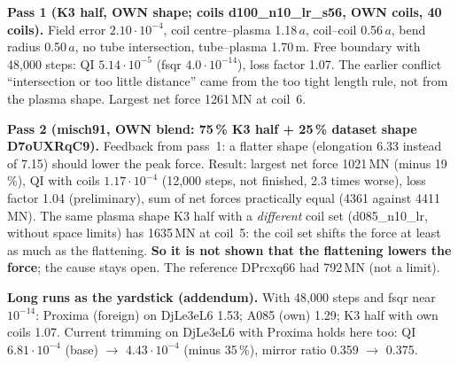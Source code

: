 \textbf{Pass 1 (K3 half, OWN shape; coils d100\_n10\_lr\_s56, OWN coils, 40 coils).} Field error $2.10\cdot10^{-4}$, coil centre--plasma 1.18\,$a$, coil--coil 0.56\,$a$, bend radius 0.50\,$a$, no tube intersection, tube--plasma 1.70\,m. Free boundary with
48,000 steps: QI $5.14\cdot10^{-5}$ (fsqr $4.0\cdot10^{-14}$), loss factor 1.07. The earlier conflict ``intersection or too little distance'' came from the too tight length rule, not from the plasma shape. Largest net force 1261\,MN at coil~6.

\textbf{Pass 2 (misch91, OWN blend: 75\,\% K3 half + 25\,\% dataset shape D7oUXRqC9).} Feedback from pass~1: a flatter shape (elongation 6.33 instead of 7.15) should lower the peak force. Result: largest net force 1021\,MN (minus 19\,\%), QI with coils $1.17\cdot10^{-4}$ (12,000 steps, not finished,
2.3 times worse), loss factor 1.04 (preliminary), sum of net forces practically equal (4361 against 4411\,MN). The same plasma shape K3 half with a \emph{different} coil set (d085\_n10\_lr, without space limits) has 1635\,MN at coil~5: the coil set shifts the force at least as much as
the flattening. \textbf{So it is not shown that the flattening lowers the force}; the cause stays open. The reference DPrcxq66 had 792\,MN (not a limit).

\textbf{Long runs as the yardstick (addendum).} With 48,000 steps and fsqr near $10^{-14}$: Proxima (foreign) on DjLe3eL6 1.53; A085 (own) 1.29; K3 half with own coils 1.07. Current trimming on DjLe3eL6 with Proxima holds here too: QI $6.81\cdot10^{-4}$ (base) $\to$ $4.43\cdot10^{-4}$ (minus 35\,\%), mirror ratio 0.359 $\to$ 0.375.

